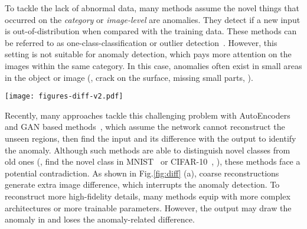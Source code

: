 \documentclass[final]{cvpr}
\begin{document}
To tackle the lack of abnormal data, many methods assume the novel things that occurred on the \textit{category} or \textit{image-level} are anomalies. They detect if a new input is out-of-distribution when compared with the training data. These methods can be referred to as one-class-classification or outlier detection~\cite{A:andrews2016transfer,A:napoletano2018anomaly,A:ruff2020deep,A:tax2004support}. However, 
this setting is not suitable for anomaly detection, which pays more attention on the images within the same category. In this case, anomalies often exist in small areas in the object or image (\eg, crack on the surface, missing small parts, \etc).

\begin{figure*} 
	\begin{center}
		\texttt{[image: figures-diff-v2.pdf]} 
	\end{center}
	\vspace{-0.3cm}
	\caption{
		Comparisons of different anomaly detection methods. 
		Many one-stage methods reconstruct the structure of the input but without details (A)~\cite{A:akcay2018ganomaly,A:baur2018deep,A:bergmann2018improving} or high-fidelity reconstruction yet draw in anomaly regions (B)~\cite{A:akccay2019skip}.
		(c) We tackle the contradiction by extracting the anomaly-free structure () and adding high-fidelity details in two stages.
	}
	\vspace{-0.4cm}
	\label{fig:diff}
\end{figure*}

Recently, many approaches tackle this challenging problem with AutoEncoders~\cite{A:baur2018deep,A:bergmann2018improving,A:carrera2016defect,A:gong2019memorizing} and GAN based methods~\cite{A:akcay2018ganomaly,A:akccay2019skip,A:schlegl2017unsupervised}, which assume the network cannot reconstruct the unseen regions, then find the input and its difference with the output to identify the anomaly. 
Although such methods are able to distinguish novel classes from old ones (\eg, find the novel class in MNIST~\cite{B:lecun1998MNIST} or CIFAR-10~\cite{B:krizhevsky2009CIFAR10}, \etc), these methods face a potential contradiction. 
As shown in Fig.\ref{fig:diff} (a), coarse reconstructions generate extra image difference, which interrupts the anomaly detection. To reconstruct more high-fidelity details, many methods\cite{A:akccay2019skip,A:ronneberger2015unet} equip with more complex architectures or more trainable parameters. However, the output may draw the anomaly in and loses the anomaly-related difference.
\end{document}
